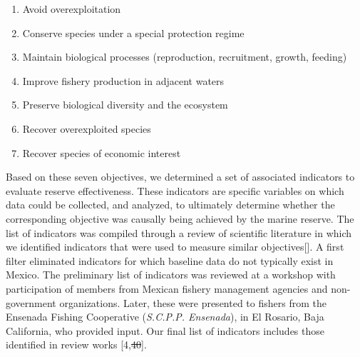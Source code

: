 \documentclass[12pt,]{article}
\providecommand{\tightlist}{%
  \setlength{\itemsep}{0pt}\setlength{\parskip}{0pt}}
\providecommand{\DIFaddtex}[1]{{\protect\color{blue}\uwave{#1}}} %
\providecommand{\DIFdeltex}[1]{{\protect\color{red}\sout{#1}}}                      %
\providecommand{\DIFaddbegin}{} %
\providecommand{\DIFaddend}{} %
\providecommand{\DIFdelbegin}{} %
\providecommand{\DIFdelend}{} %
\providecommand{\DIFadd}[1]{\texorpdfstring{\DIFaddtex{#1}}{#1}} %
\providecommand{\DIFdel}[1]{\texorpdfstring{\DIFdeltex{#1}}{}} %
\newcommand{\DIFscaledelfig}{0.5}
\newlength{\DIFdelgraphicswidth} %
\newlength{\DIFdelgraphicsheight} %
\newcommand{\DIFaddincludegraphics}[2][]{{\color{blue}\fbox{\DIFOincludegraphics[#1]{#2}}}} %
\newcommand{\DIFdelincludegraphics}[2][]{%
\sbox{\DIFdelgraphicsbox}{\DIFOincludegraphics[#1]{#2}}%
\settoboxwidth{\DIFdelgraphicswidth}{\DIFdelgraphicsbox} %
\settoboxtotalheight{\DIFdelgraphicsheight}{\DIFdelgraphicsbox} %
\scalebox{\DIFscaledelfig}{%
\parbox[b]{\DIFdelgraphicswidth}{\usebox{\DIFdelgraphicsbox}\\[-\baselineskip] \rule{\DIFdelgraphicswidth}{0em}}\llap{\resizebox{\DIFdelgraphicswidth}{\DIFdelgraphicsheight}{%
\setlength{\unitlength}{\DIFdelgraphicswidth}%
\begin{picture}(1,1)%
\thicklines\linethickness{2pt} %
{\color[rgb]{1,0,0}\put(0,0){\framebox(1,1){}}}%
{\color[rgb]{1,0,0}\put(0,0){\line( 1,1){1}}}%
{\color[rgb]{1,0,0}\put(0,1){\line(1,-1){1}}}%
\end{picture}%
}\hspace*{3pt}}} %
} %
\DeclareRobustCommand{\DIFaddbegin}{\DIFOaddbegin \let\includegraphics\DIFaddincludegraphics} %
\DeclareRobustCommand{\DIFaddend}{\DIFOaddend \let\includegraphics\DIFOincludegraphics} %
\DeclareRobustCommand{\DIFdelbegin}{\DIFOdelbegin \let\includegraphics\DIFdelincludegraphics} %
\DeclareRobustCommand{\DIFdelend}{\DIFOaddend \let\includegraphics\DIFOincludegraphics} %
\begin{document}
\begin{enumerate}
\def\labelenumi{\arabic{enumi}.}
\tightlist
\item
  Avoid overexploitation
\item
  Conserve species under a special protection regime
\item
  Maintain biological processes (reproduction, recruitment, growth,
  feeding)
\item
  Improve fishery production in adjacent waters
\item
  Preserve biological diversity and the ecosystem
\item
  Recover overexploited species
\item
  Recover species of economic interest
\end{enumerate}

Based on these seven objectives, we determined a set of associated
indicators to evaluate reserve effectiveness. These indicators are
specific variables on which data could be collected, and analyzed, to
ultimately determine whether the corresponding objective was causally
being achieved by the marine reserve. The list of indicators was
compiled through a review of scientific literature in which we
identified indicators that were used to measure similar
objectives\DIFaddbegin {[}\DIFadd{3--5,7,11,13,14,18--21,23,24,41--44}{]}\DIFaddend . A first filter
eliminated indicators for which baseline data do not typically exist in
Mexico. The preliminary list of indicators was reviewed at a workshop
with participation of members from Mexican fishery management agencies
and non-government organizations. Later, these were presented to fishers
from the Ensenada Fishing Cooperative (\emph{S.C.P.P. Ensenada}), in El
Rosario, Baja California, who provided input. Our final list of
indicators includes those identified in review works {[}4,\DIFdelbegin \DIFdel{40}\DIFdelend \DIFaddbegin \DIFadd{44}\DIFaddend {]}.
\end{document}
